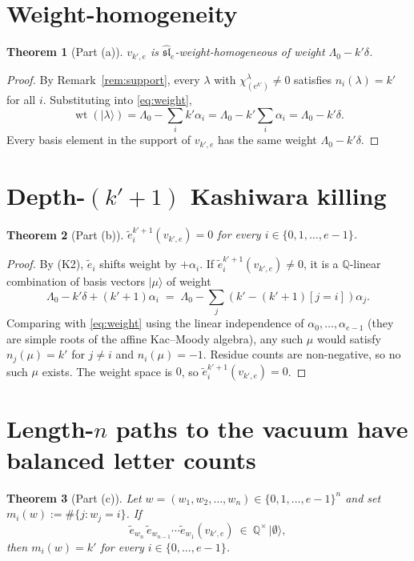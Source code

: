 \documentclass[11pt]{article}
\newtheorem{theorem}{Theorem}
\theoremstyle{definition}
\DeclareMathOperator{\wt}{wt}
\newcommand{\slh}{\widehat{\mathfrak{sl}}}
\newcommand{\te}{\tilde e}
\begin{document}
\section{Weight-homogeneity}

\begin{theorem}[Part (a)]\label{thm:weight}
$v_{k',e}$ is $\slh_e$-weight-homogeneous of weight $\Lambda_0 - k'\delta$.
\end{theorem}

\begin{proof}
By Remark~\ref{rem:support}, every $\lambda$ with $\chi^\lambda_{(e^{k'})}\ne 0$ satisfies
$n_i(\lambda) = k'$ for all $i$. Substituting into \eqref{eq:weight},
\[
  \wt(|\lambda\rangle) = \Lambda_0 - \sum_i k'\alpha_i
     = \Lambda_0 - k'\sum_i\alpha_i = \Lambda_0 - k'\delta.
\]
Every basis element in the support of $v_{k',e}$ has the same weight
$\Lambda_0 - k'\delta$.
\end{proof}

\section{Depth-$(k'+1)$ Kashiwara killing}

\begin{theorem}[Part (b)]\label{thm:kill}
$\te_i^{k'+1}(v_{k',e}) = 0$ for every $i \in \{0,1,\ldots,e-1\}$.
\end{theorem}

\begin{proof}
By (K2), $\te_i$ shifts weight by $+\alpha_i$. If $\te_i^{k'+1}(v_{k',e})\ne 0$, it is a
$\mathbb{Q}$-linear combination of basis vectors $|\mu\rangle$ of weight
\[
  \Lambda_0 - k'\delta + (k'+1)\alpha_i \;=\; \Lambda_0 - \sum_j (k' - (k'+1)[j=i])\alpha_j.
\]
Comparing with \eqref{eq:weight} using the linear independence of $\alpha_0,\ldots,
\alpha_{e-1}$ (they are simple roots of the affine Kac--Moody algebra), any such $\mu$
would satisfy $n_j(\mu) = k'$ for $j\ne i$ and $n_i(\mu) = -1$. Residue counts are
non-negative, so no such $\mu$ exists. The weight space is $0$, so
$\te_i^{k'+1}(v_{k',e}) = 0$.
\end{proof}

\section{Length-$n$ paths to the vacuum have balanced letter counts}

\begin{theorem}[Part (c)]\label{thm:balanced}
Let $w = (w_1, w_2, \ldots, w_n) \in \{0,1,\ldots,e-1\}^n$ and set
$m_i(w) := \#\{j : w_j = i\}$. If
\[
  \te_{w_n}\,\te_{w_{n-1}}\cdots\te_{w_1}(v_{k',e}) \ \in\ \mathbb{Q}^{\times}\,
   |\emptyset\rangle,
\]
then $m_i(w) = k'$ for every $i \in \{0,\ldots,e-1\}$.
\end{theorem}
\end{document}

